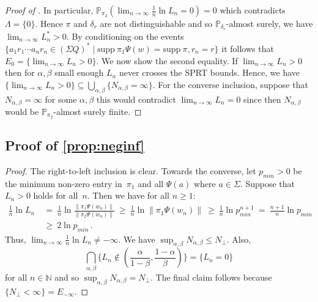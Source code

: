 \documentclass[a4paper,UKenglish,cleveref, autoref,mathscr]{lipics-v2019}
\newcommand{\NN}{\mathbb{N}}
\newcommand{\PP}{\mathbb{P}}
\newcommand{\1}{\mathbbm{1}}
\newcommand{\supp}{\mathrm{supp}}
\newcommand{\liexp}{\lim_{n\rightarrow\infty} \frac1n \ln L_n}
\newcommand{\stefan}[1]{\marginpar{\textcolor{blue}{#1}}}
\renewcommand{\stefan}[1]{}
\begin{document}
\begin{proof}[Proof of ]
In particular, $\PP_{\pi_2}(\lim_{n \rightarrow \infty} \frac1n \ln L_n = 0 ) = 0$ which contradicts $\Lambda = \{0\}$. Hence $\pi$ and $\delta_r$ are not distinguishable and so $\PP_{\delta_r}$-almost surely, we have $\lim_{n \rightarrow \infty} L_n^* > 0$. By conditioning on the events $\{a_1 r_1 \cdots a_n r_n \in (\Sigma Q)^* \mid \supp~\pi_1 \Psi(w) = \supp~ \pi, r_n = r\}$ it follows that $E_0 = \{\lim_{n \rightarrow \infty} L_n > 0\}$. We now show the second equality. If $\lim_{n \rightarrow \infty} L_n > 0$ then for $\alpha, \beta$ small enough $L_n$ never crosses the SPRT bounds. Hence, we have $\{\lim_{n \rightarrow \infty} L_n > 0\} \subseteq \bigcup_{\alpha, \beta} \{N_{\alpha, \beta} = \infty\}$. For the converse inclusion, suppose that $N_{\alpha, \beta} = \infty$ for some $\alpha, \beta$ this would contradict $\lim_{n \rightarrow \infty} L_n = 0$ since then $N_{\alpha, \beta}$ would be $\PP_{\pi_2}$-almost surely finite.
\end{proof}

\subsection{Proof of \cref{prop:neginf}}

\propneginf*
\begin{proof}
The right-to-left inclusion is clear.
\newcommand{\pmin}{p_{\mathit{min}}}
Towards the converse, let $\pmin>0$ be the minimum non-zero entry in~$\pi_1$ and all $\Psi(a)$ where $a \in \Sigma$.
Suppose that $L_n>0$ holds for all~$n$.
Then we have for all $n \ge 1$:
\begin{align*}
 \frac1n \ln L_n \ &=\ \frac1n \ln \frac{\| \pi_1 \Psi(w_n) \|}{\| \pi_2 \Psi(w_n) \|} \ \ge\ \frac1n  \ln \| \pi_1 \Psi(w_n) \| \ \ge\ \frac1n \ln \pmin^{n+1} \ = \ \frac{n+1}{n} \ln \pmin \\
                   &\ge\ 2 \ln \pmin\,.
\end{align*}
Thus, $\liexp \ne -\infty$. We have $\sup_{\alpha, \beta} N_{\alpha, \beta} \leq N_\perp$. Also,
\begin{equation*}
\bigcap_{\alpha, \beta} \{L_n \not\in (\frac{\alpha}{1-\beta},\frac{1-\alpha}{\beta})\} = \{L_n = 0\}
\end{equation*}
for all $n \in \NN$ and so $\sup_{\alpha, \beta} N_{\alpha, \beta} = N_\perp$. The final claim follows because $\{N_\perp < \infty\} = E_{-\infty}$.
\stefan{The things about $N_{\alpha, \beta}$ might require justification.}
\end{proof}
\end{document}
